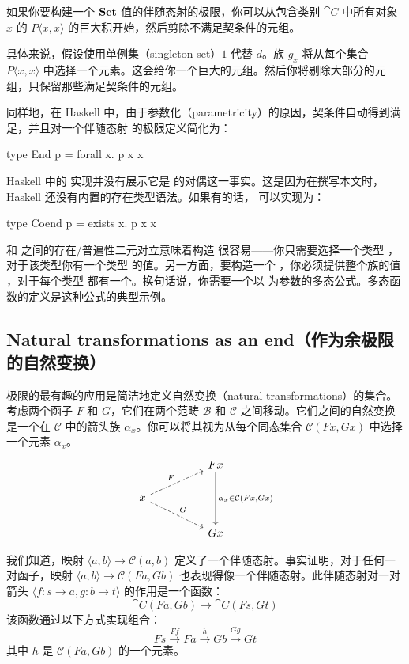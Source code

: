 \documentclass[DaoFP]{subfiles}
\begin{document}
 如果你要构建一个 $\mathbf{Set}$-值的伴随态射的极限，你可以从包含类别 $\cat C$ 中所有对象 $x$ 的 $P \langle x, x \rangle$ 的巨大积开始，然后剪除不满足契条件的元组。

 具体来说，假设使用单例集（singleton set）$1$ 代替 $d$。族 $g_x$ 将从每个集合 $P \langle x, x \rangle$ 中选择一个元素。这会给你一个巨大的元组。然后你将剔除大部分的元组，只保留那些满足契条件的元组。

 同样地，在 Haskell 中，由于参数化（parametricity）的原因，契条件自动得到满足，并且对一个伴随态射  的极限定义简化为：

 \begin{haskell}
  type End p = forall x. p x x
 \end{haskell}

 Haskell 中的  实现并没有展示它是  的对偶这一事实。这是因为在撰写本文时，Haskell 还没有内置的存在类型语法。如果有的话， 可以实现为：
 \begin{haskell}
  type Coend p = exists x. p x x
 \end{haskell}

  和  之间的存在/普遍性二元对立意味着构造  很容易——你只需要选择一个类型 ，对于该类型你有一个类型  的值。另一方面，要构造一个 ，你必须提供整个族的值 ，对于每个类型  都有一个。换句话说，你需要一个以  为参数的多态公式。多态函数的定义是这种公式的典型示例。

 \subsection{Natural transformations as an end（作为余极限的自然变换）}

 极限的最有趣的应用是简洁地定义自然变换（natural transformations）的集合。考虑两个函子 $F$ 和 $G$，它们在两个范畴 $\mathcal{B}$ 和 $\mathcal{C}$ 之间移动。它们之间的自然变换是一个在 $\mathcal{C}$ 中的箭头族 $\alpha_x$。你可以将其视为从每个同态集合 $\mathcal{C} (F x, G x)$ 中选择一个元素 $\alpha_x$。
 \[
  \begin{tikzcd}
   && F x
   \arrow[dd, "{\alpha_x \in \cat C (F x, G x)}"]
   \\
   x
   \arrow[urr, dashed, "F"]
   \arrow[drr, dashed, "G"]
   \\
   && G x
  \end{tikzcd}
 \]

 我们知道，映射 $\langle a, b \rangle \to \mathcal{C} (a, b)$ 定义了一个伴随态射。事实证明，对于任何一对函子，映射 $\langle a, b \rangle \to \mathcal{C} (F a, G b)$ 也表现得像一个伴随态射。此伴随态射对一对箭头 $\langle f \colon s \to a, g \colon b \to t \rangle$ 的作用是一个函数：
 \[ \cat C(F a, G b) \to \cat C (F s, G t) \]
 该函数通过以下方式实现组合：
 \[ F s \xrightarrow{F f} F a \xrightarrow{h} G b \xrightarrow{G g} G t \]
 其中 $h$ 是 $\mathcal{C} (F a, G b)$ 的一个元素。
\end{document}
